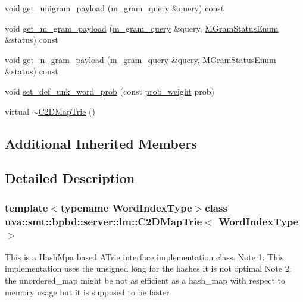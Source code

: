 \begin{DoxyCompactItemize}
void \hyperlink{classuva_1_1smt_1_1bpbd_1_1server_1_1lm_1_1_c2_d_map_trie_a45989722cc4dbaba44aff665bfb762b8}{get\+\_\+unigram\+\_\+payload} (\hyperlink{classuva_1_1smt_1_1bpbd_1_1server_1_1lm_1_1m__gram__query}{m\+\_\+gram\+\_\+query} \&query) const 
\item 
void \hyperlink{classuva_1_1smt_1_1bpbd_1_1server_1_1lm_1_1_c2_d_map_trie_ac73766816943fac2cf6604b05d0b6d26}{get\+\_\+m\+\_\+gram\+\_\+payload} (\hyperlink{classuva_1_1smt_1_1bpbd_1_1server_1_1lm_1_1m__gram__query}{m\+\_\+gram\+\_\+query} \&query, \hyperlink{namespaceuva_1_1smt_1_1bpbd_1_1server_1_1lm_ab9b3e7382b561dcb8abcd6b55e9b796a}{M\+Gram\+Status\+Enum} \&status) const 
\item 
void \hyperlink{classuva_1_1smt_1_1bpbd_1_1server_1_1lm_1_1_c2_d_map_trie_aa19e25da90b8c6909cb91a098e1c3631}{get\+\_\+n\+\_\+gram\+\_\+payload} (\hyperlink{classuva_1_1smt_1_1bpbd_1_1server_1_1lm_1_1m__gram__query}{m\+\_\+gram\+\_\+query} \&query, \hyperlink{namespaceuva_1_1smt_1_1bpbd_1_1server_1_1lm_ab9b3e7382b561dcb8abcd6b55e9b796a}{M\+Gram\+Status\+Enum} \&status) const 
\item 
void \hyperlink{classuva_1_1smt_1_1bpbd_1_1server_1_1lm_1_1_c2_d_map_trie_a0e4789f6a7fed998413e9feccdae719e}{set\+\_\+def\+\_\+unk\+\_\+word\+\_\+prob} (const \hyperlink{namespaceuva_1_1smt_1_1bpbd_1_1server_a01e9ea4de9c226f4464862e84ff0bbcc}{prob\+\_\+weight} prob)
\item 
virtual \hyperlink{classuva_1_1smt_1_1bpbd_1_1server_1_1lm_1_1_c2_d_map_trie_af0b5967d9fd12eec2f69dfc13f1971ca}{$\sim$\+C2\+D\+Map\+Trie} ()
\end{DoxyCompactItemize}
\subsection*{Additional Inherited Members}


\subsection{Detailed Description}
\subsubsection*{template$<$typename Word\+Index\+Type$>$class uva\+::smt\+::bpbd\+::server\+::lm\+::\+C2\+D\+Map\+Trie$<$ Word\+Index\+Type $>$}

This is a Hash\+Mpa based A\+Trie interface implementation class. Note 1\+: This implementation uses the unsigned long for the hashes it is not optimal Note 2\+: the unordered\+\_\+map might be not as efficient as a hash\+\_\+map with respect to memory usage but it is supposed to be faster

